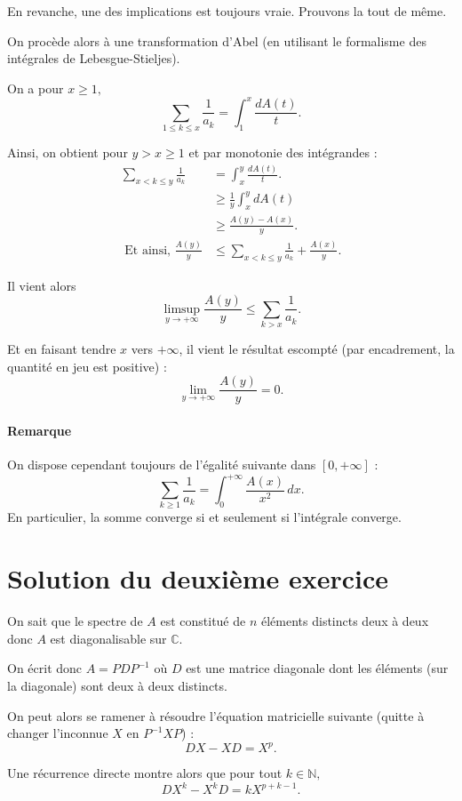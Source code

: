 En revanche, une des implications est toujours vraie. Prouvons la tout de même.

On procède alors à une transformation d'Abel (en utilisant le formalisme des intégrales de Lebesgue-Stieljes).

On a pour $x\geq 1,$
$$\sum_{1\leq k\leq x}\frac{1}{a_{k}} = \int_{1}^{x}\frac{dA(t)}{t}.$$

Ainsi, on obtient pour $y>x\geq 1$ et par monotonie des intégrandes :
\begin{align*} 
\sum_{x<k\leq y}\frac{1}{a_{k}} & =\int_{x}^{y}\frac{dA(t)}{t}.\\
& \geq \frac{1}{y}\int_{x}^{y}dA(t)\\
& \geq \frac{A(y)-A(x)}{y}.\\
\mbox{ Et ainsi, } \frac{A(y)}{y} & \leq \sum_{x<k\leq y}\frac{1}{a_{k}}+ \frac{A(x)}{y}.
\end{align*}

Il vient alors $$\limsup_{y\rightarrow +\infty}\frac{A(y)}{y} \leq \sum_{k>x}\frac{1}{a_{k}}.$$

Et en faisant tendre $x$ vers $+\infty$, il vient le résultat escompté (par encadrement, la quantité en jeu est positive) : $$\lim_{y\rightarrow +\infty}\frac{A(y)}{y}=0.$$

\paragraph{Remarque} %
On dispose cependant toujours de l'égalité suivante dans $[0,+\infty]$ :
\[
\sum_{k\geqslant 1} \frac1{a_k} = \int_0^{+\infty} \frac{A(x)}{x^2}\,dx.
\]
En particulier, la somme converge si et seulement si l'intégrale converge.

\section{Solution du deuxième exercice}

On sait que le spectre de $A$ est constitué de $n$ éléments distincts deux à deux donc $A$ est diagonalisable sur $\mathbb{C}.$

On écrit donc $A=PDP^{-1}$ où $D$ est une matrice diagonale dont les éléments (sur la diagonale) sont deux à deux distincts.

On peut alors se ramener à résoudre  l'équation matricielle suivante (quitte à changer l'inconnue $X$ en $P^{-1}XP$) : $$DX-XD=X^{p}.$$

Une récurrence directe montre alors que pour tout $k\in \mathbb{N},$ $$DX^{k}-X^{k}D=kX^{p+k-1}.$$

